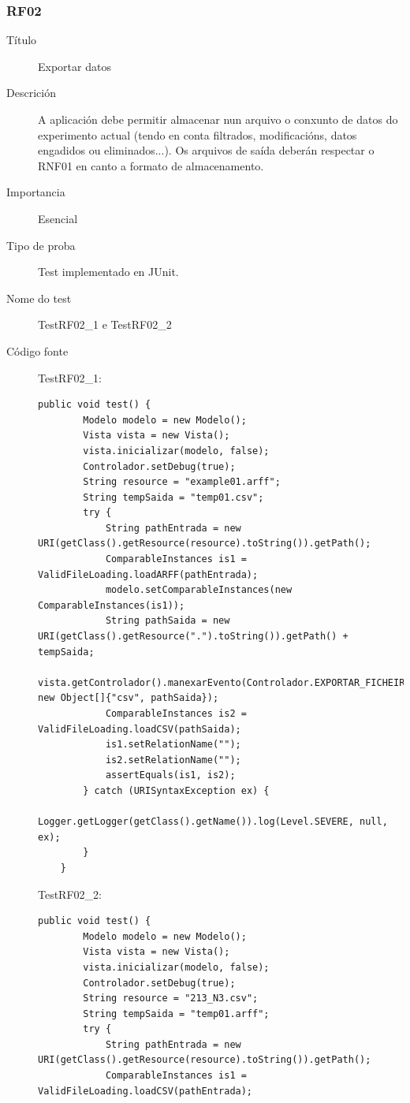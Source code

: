 \subsubsection*{RF02}
\begin{description}
\item[Título] \hfill
Exportar datos
\item[Descrición] \hfill
A aplicación debe permitir almacenar nun arquivo o conxunto de datos do experimento actual (tendo en conta filtrados, modificacións, datos engadidos ou eliminados...). Os arquivos de saída deberán respectar o RNF01 en canto a formato de almacenamento.
\item[Importancia] \hfill
Esencial
\item[Tipo de proba] \hfill
Test implementado en JUnit.
\item[Nome do test] \hfill
TestRF02\_1 e TestRF02\_2
\item[Código fonte]
TestRF02\_1:
\begin{lstlisting}
public void test() {
        Modelo modelo = new Modelo();
        Vista vista = new Vista();
        vista.inicializar(modelo, false);
        Controlador.setDebug(true);
        String resource = "example01.arff";
        String tempSaida = "temp01.csv";
        try {
            String pathEntrada = new URI(getClass().getResource(resource).toString()).getPath();
            ComparableInstances is1 = ValidFileLoading.loadARFF(pathEntrada);
            modelo.setComparableInstances(new ComparableInstances(is1));
            String pathSaida = new URI(getClass().getResource(".").toString()).getPath() + tempSaida;
            vista.getControlador().manexarEvento(Controlador.EXPORTAR_FICHEIRO, new Object[]{"csv", pathSaida});
            ComparableInstances is2 = ValidFileLoading.loadCSV(pathSaida);
            is1.setRelationName("");
            is2.setRelationName("");
            assertEquals(is1, is2);
        } catch (URISyntaxException ex) {
            Logger.getLogger(getClass().getName()).log(Level.SEVERE, null, ex);
        }
    } 
\end{lstlisting}
TestRF02\_2:
\begin{lstlisting}
public void test() {
        Modelo modelo = new Modelo();
        Vista vista = new Vista();
        vista.inicializar(modelo, false);
        Controlador.setDebug(true);
        String resource = "213_N3.csv";
        String tempSaida = "temp01.arff";
        try {
            String pathEntrada = new URI(getClass().getResource(resource).toString()).getPath();
            ComparableInstances is1 = ValidFileLoading.loadCSV(pathEntrada);

\end{lstlisting}
\end{description}
